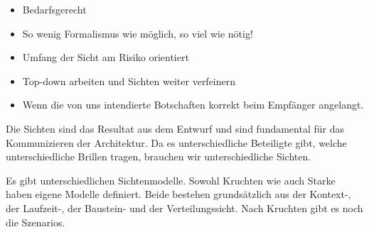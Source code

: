 \begin{itemize}
	\item Bedarfsgerecht
	\item So wenig Formalismus wie möglich, so viel wie nötig!
	\item Umfang der Sicht am Risiko orientiert
	\item Top-down arbeiten und Sichten weiter verfeinern
	\item Wenn die von uns intendierte Botschaften korrekt beim Empfänger angelangt.
\end{itemize}

Die Sichten sind das Resultat aus dem Entwurf und sind fundamental für das Kommunizieren der Architektur. Da es unterschiedliche Beteiligte gibt, welche unterschiedliche Brillen tragen, brauchen wir unterschiedliche Sichten.

Es gibt unterschiedlichen Sichtenmodelle. Sowohl Kruchten wie auch Starke haben eigene Modelle definiert. Beide bestehen grundsätzlich aus der Kontext-, der Laufzeit-, der Baustein- und der Verteilungssicht. Nach Kruchten gibt es noch die Szenarios.

